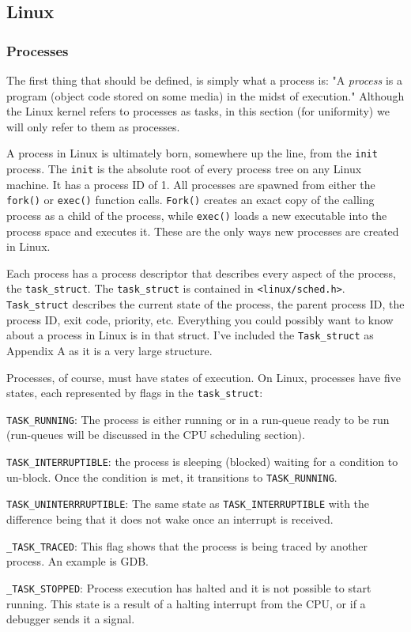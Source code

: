 \documentclass[10pt,letterpaper,onecolumn,draftclsnofoot]{IEEEtran}
\begin{document}
\subsection{Linux}
\subsubsection{Processes}
The first thing that should be defined, is simply what a process is: "A
\textit{process} is a program (object code stored on some media) in the midst of
execution."\cite{robertlove2010} Although the Linux kernel refers to processes
as tasks, in this section (for uniformity) we will only refer to them as processes.

A process in Linux is ultimately born, somewhere up the line, from the
\texttt{init} process. The \texttt{init} is the absolute root of every process
tree on any Linux machine. It has a process ID of 1. All processes are spawned
from either the \texttt{fork()} or \texttt{exec()} function calls. \texttt{Fork()}
creates an exact copy of the calling process as a child of the process, while
\texttt{exec()} loads a new executable into the process space and executes it.
These are the only ways new processes are created in Linux.

Each process has a process descriptor that describes every aspect of
the process, the \texttt{task\_struct}. The \texttt{task\_struct} is contained
in \texttt{<linux/sched.h>}. \texttt{Task\_struct} describes the current state
of the process, the parent process ID, the process ID, exit code, priority, etc.
Everything you could possibly want to know about a process in Linux is in that
struct. I've included the \texttt{Task\_struct} as Appendix A as it is a very
large structure.

Processes, of course, must have states of execution. On Linux, processes have
five states, each represented by flags in the \texttt{task\_struct}:

\begin{description}
	\item \texttt{TASK\_RUNNING}: The process is either running or in a run-queue
	ready to be run (run-queues will be discussed in the CPU scheduling section).
	\item \texttt{TASK\_INTERRUPTIBLE}: the process is sleeping (blocked) waiting
	for a condition to un-block. Once the condition is met, it transitions to
	\texttt{TASK\_RUNNING}.
	\item \texttt{TASK\_UNINTERRRUPTIBLE}: The same state as \texttt{TASK\_INTERRUPTIBLE}
	with the difference being that it does not wake once an interrupt is received.
	\item \texttt{\_TASK\_TRACED}: This flag shows that the process is being traced
	by another process. An example is GDB.
	\item \texttt{\_TASK\_STOPPED}: Process execution has halted and it is not
	possible to start running. This state is a result of a halting interrupt from
	the CPU, or if a debugger sends it a signal.
\end{description}
\end{document}

